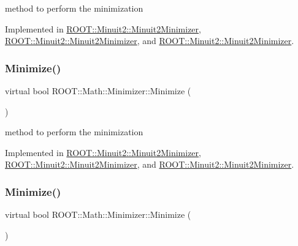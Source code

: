 method to perform the minimization 



Implemented in \mbox{\hyperlink{classROOT_1_1Minuit2_1_1Minuit2Minimizer_af5d2da195d2b1a7eac6d9b8859eec2b9}{R\+O\+O\+T\+::\+Minuit2\+::\+Minuit2\+Minimizer}}, \mbox{\hyperlink{classROOT_1_1Minuit2_1_1Minuit2Minimizer_af5d2da195d2b1a7eac6d9b8859eec2b9}{R\+O\+O\+T\+::\+Minuit2\+::\+Minuit2\+Minimizer}}, and \mbox{\hyperlink{classROOT_1_1Minuit2_1_1Minuit2Minimizer_af5d2da195d2b1a7eac6d9b8859eec2b9}{R\+O\+O\+T\+::\+Minuit2\+::\+Minuit2\+Minimizer}}.

\mbox{\label{classROOT_1_1Math_1_1Minimizer_a5f6a6307935a17fb13dac1ee7f1c41fd}} 
\subsubsection{\texorpdfstring{Minimize()}{Minimize()}\hspace{0.1cm}{\footnotesize\ttfamily [2/3]}}
{\footnotesize\ttfamily virtual bool R\+O\+O\+T\+::\+Math\+::\+Minimizer\+::\+Minimize (\begin{DoxyParamCaption}{ }\end{DoxyParamCaption})\hspace{0.3cm}{\ttfamily [pure virtual]}}



method to perform the minimization 



Implemented in \mbox{\hyperlink{classROOT_1_1Minuit2_1_1Minuit2Minimizer_af5d2da195d2b1a7eac6d9b8859eec2b9}{R\+O\+O\+T\+::\+Minuit2\+::\+Minuit2\+Minimizer}}, \mbox{\hyperlink{classROOT_1_1Minuit2_1_1Minuit2Minimizer_af5d2da195d2b1a7eac6d9b8859eec2b9}{R\+O\+O\+T\+::\+Minuit2\+::\+Minuit2\+Minimizer}}, and \mbox{\hyperlink{classROOT_1_1Minuit2_1_1Minuit2Minimizer_af5d2da195d2b1a7eac6d9b8859eec2b9}{R\+O\+O\+T\+::\+Minuit2\+::\+Minuit2\+Minimizer}}.

\mbox{\label{classROOT_1_1Math_1_1Minimizer_a5f6a6307935a17fb13dac1ee7f1c41fd}} 
\subsubsection{\texorpdfstring{Minimize()}{Minimize()}\hspace{0.1cm}{\footnotesize\ttfamily [3/3]}}
{\footnotesize\ttfamily virtual bool R\+O\+O\+T\+::\+Math\+::\+Minimizer\+::\+Minimize (\begin{DoxyParamCaption}{ }\end{DoxyParamCaption})\hspace{0.3cm}{\ttfamily [pure virtual]}}



